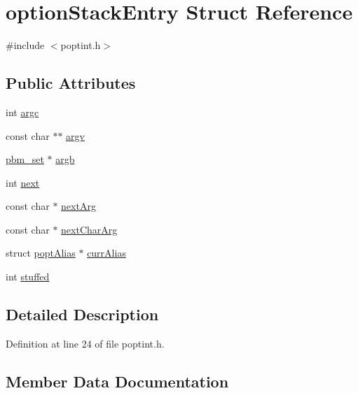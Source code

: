 \hypertarget{structoption_stack_entry}{}\section{option\+Stack\+Entry Struct Reference}
\label{structoption_stack_entry}


{\ttfamily \#include $<$poptint.\+h$>$}

\subsection*{Public Attributes}
\begin{DoxyCompactItemize}
\item 
int \hyperlink{structoption_stack_entry_abbdb0c53cd6fe3f9dd981f0176d6b76a}{argc}
\item 
const char $\ast$$\ast$ \hyperlink{structoption_stack_entry_aea9844e231fe3e3ae586033bd8bd9e4d}{argv}
\item 
\hyperlink{structpbm__set}{pbm\+\_\+set} $\ast$ \hyperlink{structoption_stack_entry_acb18bf9c40375399d0fdce906265b514}{argb}
\item 
int \hyperlink{structoption_stack_entry_abfe5c6a29f094c148cff402fba93268e}{next}
\item 
const char $\ast$ \hyperlink{structoption_stack_entry_aa67f80d13f4b7d97fb4754b9d9eaf55a}{next\+Arg}
\item 
const char $\ast$ \hyperlink{structoption_stack_entry_ab0485d4d1b9e5c1f9dd8ca4c0fda3478}{next\+Char\+Arg}
\item 
struct \hyperlink{structpopt_alias}{popt\+Alias} $\ast$ \hyperlink{structoption_stack_entry_ab314c881eccce3459b2c9865b6ea350f}{curr\+Alias}
\item 
int \hyperlink{structoption_stack_entry_a585e45e37b8f7a899434b0f94bd009b7}{stuffed}
\end{DoxyCompactItemize}


\subsection{Detailed Description}


Definition at line 24 of file poptint.\+h.



\subsection{Member Data Documentation}
\hypertarget{structoption_stack_entry_acb18bf9c40375399d0fdce906265b514}{}
